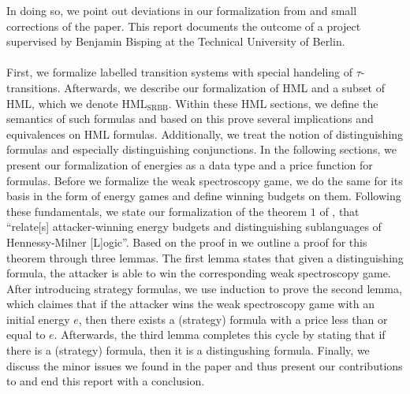 In doing so, we point out deviations in our formalization from and small corrections of the paper. This report documents the outcome of a project supervised by Benjamin Bisping at the Technical University of Berlin. 
\\\\
First, we formalize labelled transition systems with special handeling of $\tau$-transitions.
Afterwards, we describe our formalization of HML and a subset of HML, which we denote HML$_\text{SRBB}$.
Within these HML sections, we define the semantics of such formulas and based on this prove several implications and equivalences on HML formulas.
Additionally, we treat the notion of distinguishing formulas and especially distinguishing conjunctions.
In the following sections, we present our formalization of energies as a data type and a price function for formulas.
Before we formalize the weak spectroscopy game, we do the same for its basis in the form of energy games and define winning budgets on them.
Following these fundamentals, we state our formalization of the theorem $1$ of \cite{bj2023silentStepSpectroscopyArxiv}, that ``relate[s] attacker-winning energy budgets and distinguishing sublanguages of Hennessy-Milner [L]ogic''\cite[Abstract]{bj2023silentStepSpectroscopyArxiv}. 
Based on the proof in \cite{bj2023silentStepSpectroscopyArxiv} we outline a proof for this theorem through three lemmas. 
The first lemma states that given a distinguishing formula, the attacker is able to win the corresponding weak spectroscopy game.
After introducing strategy formulas, we use induction to prove the second lemma, which claimes that if the attacker wins the weak spectroscopy game with an initial energy $e$, then there exists a (strategy) formula with a price less than or equal to $e$.
Afterwards, the third lemma completes this cycle by stating that if there is a (strategy) formula, then it is a distingushing formula.
Finally, we discuss the minor issues we found in the paper and thus present our contributions to \cite{bj2023silentStepSpectroscopyArxiv} and end this report with a conclusion.
